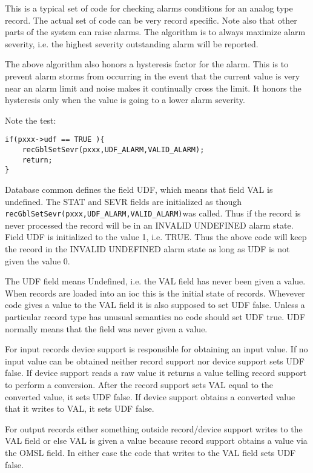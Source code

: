 This is a typical set of code for checking alarms conditions for an analog type record. The actual set of code can be very 
record specific. Note also that other parts of the system can raise alarms. The algorithm is to always maximize alarm 
severity, i.e. the highest severity outstanding alarm will be reported.

The above algorithm also honors a hysteresis factor for the alarm. This is to prevent alarm storms from occurring in the 
event that the current value is very near an alarm limit and noise makes it continually cross the limit. It honors the 
hysteresis only when the value is going to a lower alarm severity.

Note the test:

\begin{verbatim}
if(pxxx->udf == TRUE ){
    recGblSetSevr(pxxx,UDF_ALARM,VALID_ALARM);
    return;
}
\end{verbatim}

Database common defines the field UDF, which means that field VAL is undefined. The STAT and SEVR fields are 
initialized as though \verb|recGblSetSevr(pxxx,UDF_ALARM,VALID_ALARM)|was called. Thus if the record is never 
processed the record will be in an INVALID UNDEFINED alarm state. Field UDF is initialized to the value 1, i.e. TRUE. 
Thus the above code will keep the record in the INVALID UNDEFINED alarm state as long as UDF is not given the 
value 0.

The UDF field means Undefined, i.e. the VAL field has never been given a value. When records are loaded into an ioc this 
is the initial state of records. Whevever code gives a value to the VAL field it is also supposed to set UDF false. Unless a 
particular record type has unusual semantics no code should set UDF true. UDF normally means that the field was never 
given a value.

For input records device support is responsible for obtaining an input value. If no input value can be obtained neither 
record support nor device support sets UDF false. If device support reads a raw value it returns a value telling record 
support to perform a conversion. After the record support sets VAL equal to the converted value, it sets UDF false. If 
device support obtains a converted value that it writes to VAL, it sets UDF false.

For output records either something outside record/device support writes to the VAL field or else VAL is given a value 
because record support obtains a value via the OMSL field. In either case the code that writes to the VAL field sets UDF 
false.


